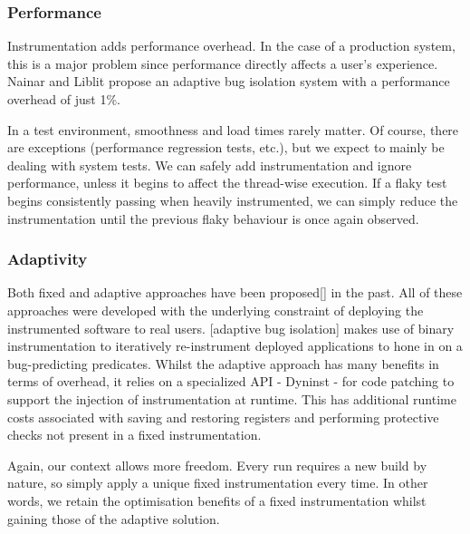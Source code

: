 \subsubsection{Performance}

Instrumentation adds performance overhead. In the case of a production system, this is a major problem since performance directly affects a user’s experience. Nainar and Liblit \cite{ArumugaNainar:2010:ABI:1806799.1806839} propose an adaptive bug isolation system with a performance overhead of just 1\%.

In a test environment, smoothness and load times rarely matter. Of course, there are exceptions (performance regression tests, etc.), but we expect to mainly be dealing with system tests. We can safely add instrumentation and ignore performance, unless it begins to affect the thread-wise execution. If a flaky test begins consistently passing when heavily instrumented, we can simply reduce the instrumentation until the previous flaky behaviour is once again observed.

\subsubsection{Adaptivity}

Both fixed and adaptive approaches have been proposed[] in the past. All of these approaches were developed with the underlying constraint of deploying the instrumented software to real users. [adaptive bug isolation] makes use of binary instrumentation to iteratively re-instrument deployed applications to hone in on a bug-predicting predicates. Whilst the adaptive approach has many benefits in terms of overhead, it relies on a specialized API - Dyninst - for code patching to support the injection of  instrumentation at runtime. This has additional runtime costs \cite{DyninstGuide} associated with saving and restoring registers and performing protective checks not present in a fixed instrumentation.

Again, our context allows more freedom. Every run requires a new build by nature, so simply apply a unique fixed instrumentation every time. In other words, we retain the optimisation benefits of a fixed instrumentation whilst gaining those of the adaptive solution.
